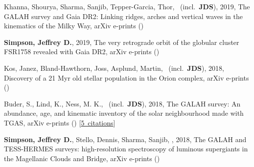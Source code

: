 \item[{\color{numcolor}\scriptsize5}] Khanna, Shourya, Sharma, Sanjib, Tepper-Garcia, Thor, \etal\ (incl.\ \textbf{JDS}), 2019, The GALAH survey and Gaia DR2: Linking ridges, arches and vertical waves in the kinematics of the Milky Way, arXiv e-prints ()

\item[{\color{numcolor}\scriptsize4}] \textbf{Simpson, Jeffrey D.}, 2019, The very retrograde orbit of the globular cluster FSR1758 revealed with Gaia DR2, arXiv e-prints ()

\item[{\color{numcolor}\scriptsize3}] Kos, Janez, Bland-Hawthorn, Joss, Asplund, Martin, \etal\ (incl.\ \textbf{JDS}), 2018, Discovery of a 21 Myr old stellar population in the Orion complex, arXiv e-prints ()

\item[{\color{numcolor}\scriptsize2}] Buder, S., Lind, K., Ness, M. K., \etal\ (incl.\ \textbf{JDS}), 2018, The GALAH survey: An abundance, age, and kinematic inventory of the solar neighbourhood made with TGAS, arXiv e-prints () [\href{https://ui.adsabs.harvard.edu/#abs/2018arXiv180405869B}{5~citations}]

\item[{\color{numcolor}\scriptsize1}] \textbf{Simpson, Jeffrey D.}, Stello, Dennis, Sharma, Sanjib, \etal, 2018, The GALAH and TESS-HERMES surveys: high-resolution spectroscopy of luminous supergiants in the Magellanic Clouds and Bridge, arXiv e-prints ()